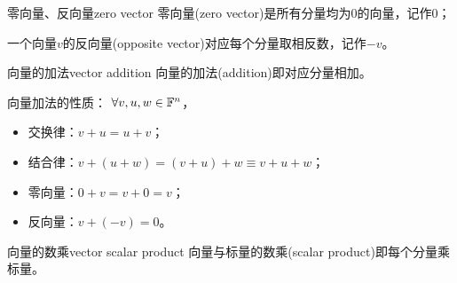 \begin{definition}{零向量、反向量}{zero vector}
	零向量(zero vector)是所有分量均为0的向量，记作0；
	
	一个向量$v$的反向量(opposite vector)对应每个分量取相反数，记作$-v$。
\end{definition}
\begin{definition}{向量的加法}{vector addition}
	向量的加法(addition)即对应分量相加。
\end{definition}

\begin{corollary}
	向量加法的性质：%
	$\forall v,u,w\in\mathbb F^n$，
    \begin{itemize}
    	\item 交换律：$v+u=u+v$；
    	\item 结合律：$v+(u+w)=(v+u)+w\equiv v+u+w$；
    	\item 零向量：$0+v=v+0=v$；
    	\item 反向量：$v+(-v)=0$。
    \end{itemize}
\end{corollary}

\begin{definition}{向量的数乘}{vector scalar product}
	向量与标量的数乘(scalar product)即每个分量乘标量。
\end{definition}

